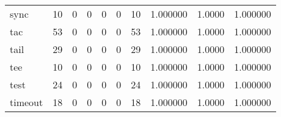 \begin{tabular}{lrrrrrrrrr}
sync      &                                       10 &                                                  0 &                                                  0 &                                                  0 &                                                  0 &                                                 10 &                                           1.000000 &                                 1.0000 &                             1.000000 \\
tac       &                                       53 &                                                  0 &                                                  0 &                                                  0 &                                                  0 &                                                 53 &                                           1.000000 &                                 1.0000 &                             1.000000 \\
tail      &                                       29 &                                                  0 &                                                  0 &                                                  0 &                                                  0 &                                                 29 &                                           1.000000 &                                 1.0000 &                             1.000000 \\
tee       &                                       10 &                                                  0 &                                                  0 &                                                  0 &                                                  0 &                                                 10 &                                           1.000000 &                                 1.0000 &                             1.000000 \\
test      &                                       24 &                                                  0 &                                                  0 &                                                  0 &                                                  0 &                                                 24 &                                           1.000000 &                                 1.0000 &                             1.000000 \\
timeout   &                                       18 &                                                  0 &                                                  0 &                                                  0 &                                                  0 &                                                 18 &                                           1.000000 &                                 1.0000 &                             1.000000 \\

\end{tabular}
